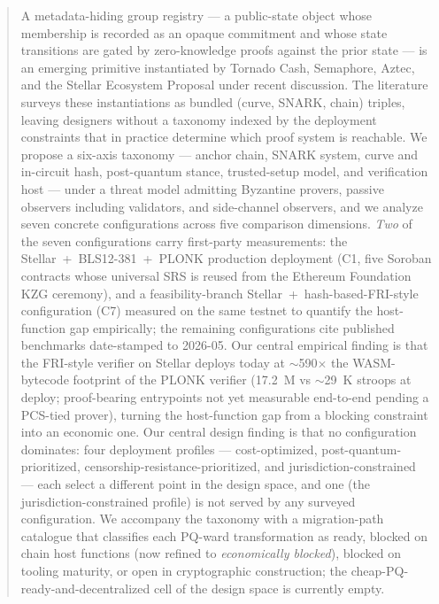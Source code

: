\begin{abstract}
A metadata-hiding group registry --- a public-state object whose
membership is recorded as an opaque commitment and whose state
transitions are gated by zero-knowledge proofs against the prior state
--- is an emerging primitive instantiated by Tornado Cash, Semaphore,
Aztec, and the Stellar Ecosystem Proposal under recent discussion.
The literature surveys these instantiations as bundled
(curve, SNARK, chain) triples, leaving designers without a taxonomy
indexed by the deployment constraints that in practice determine which
proof system is reachable. We propose a six-axis taxonomy --- anchor
chain, SNARK system, curve and in-circuit hash, post-quantum stance,
trusted-setup model, and verification host --- under a threat model
admitting Byzantine provers, passive observers including validators,
and side-channel observers, and we analyze seven concrete configurations
across five comparison dimensions. \emph{Two} of the seven
configurations carry first-party measurements: the
Stellar~+~BLS12-381~+~PLONK production deployment (C1, five Soroban
contracts whose universal SRS is reused from the Ethereum Foundation
KZG ceremony), and a feasibility-branch
Stellar~+~hash-based-FRI-style configuration (C7) measured on the
same testnet to quantify the host-function gap empirically; the
remaining configurations cite published benchmarks date-stamped to
2026-05. Our central empirical finding is that
the FRI-style verifier on Stellar deploys today at $\sim$590$\times$
the WASM-bytecode footprint of the PLONK verifier (17.2~M vs
$\sim$29~K stroops at deploy; proof-bearing entrypoints not yet
measurable end-to-end pending a PCS-tied prover), turning the
host-function gap from a blocking constraint into an economic one.
Our central design finding is that no configuration dominates: four
deployment profiles --- cost-optimized,
post-quantum-prioritized, censorship-resistance-prioritized, and
jurisdiction-constrained --- each select a different point in the
design space, and one (the jurisdiction-constrained profile) is not
served by any surveyed configuration. We accompany the taxonomy with
a migration-path catalogue that classifies each PQ-ward transformation
as ready, blocked on chain host functions (now refined to
\emph{economically blocked}), blocked on tooling maturity, or open in
cryptographic construction; the cheap-PQ-ready-and-decentralized cell
of the design space is currently empty.
\end{abstract}
